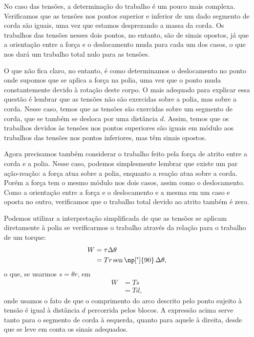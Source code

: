 No caso das tensões, a determinação do trabalho é um pouco mais complexa. Verificamos que as tensões nos pontos superior e inferior de um dado segmento de corda são iguais, uma vez que estamos desprezando a massa da corda. Os trabalhos das tensões nesses dois pontos, no entanto, são de sinais opostos, já que a orientação entre a força e o deslocamento muda para cada um dos casos, o que nos dará um trabalho total nulo para as tensões.

O que não fica claro, no entanto, é como determinamos o deslocamento no ponto onde supomos que se aplica a força na polia, uma vez que o ponto muda constantemente devido à rotação deste corpo. O mais adequado para explicar essa questão é lembrar que as tensões não são exercidas sobre a polia, mas sobre a corda. Nesse caso, temos que as tensões são exercidas sobre um segmento de corda, que se também se desloca por uma distância $d$. Assim, temos que os trabalhos devidos às tensões nos pontos superiores são iguais em módulo aos trabalhos das tensões nos pontos inferiores, mas têm sinais opostos.

Agora precisamos também considerar o trabalho feito pela força de atrito entre a corda e a polia. Nesse caso, podemos simplesmente lembrar que existe um par ação-reação: a força atua sobre a polia, enquanto a reação atua sobre a corda. Porém a força tem o mesmo módulo nos dois casos, assim como o deslocamento. Como a orientação entre a força e o deslocamento e a mesma em um caso e oposta no outro, verificamos que o trabalho total devido ao atrito também é zero.

Podemos utilizar a interpretação simplificada de que as tensões se aplicam diretamente à polia se verificarmos o trabalho através da relação para o trabalho de um torque:
\begin{align}
    W &= \tau \Delta\theta \\
    &= T r \sen\np[\tcdegree]{90} \, \Delta \theta,
\end{align}
%
o que, se usarmos $s = \theta r$, em
\begin{align}
    W &= T s \\
    &= T d,
\end{align}
%
onde usamos o fato de que o comprimento do arco descrito pelo ponto sujeito à tensão é igual à distância $d$ percorrida pelos blocos. A expressão acima serve tanto para o segmento de corda à esquerda, quanto para aquele à direita, desde que se leve em conta os sinais adequados.

